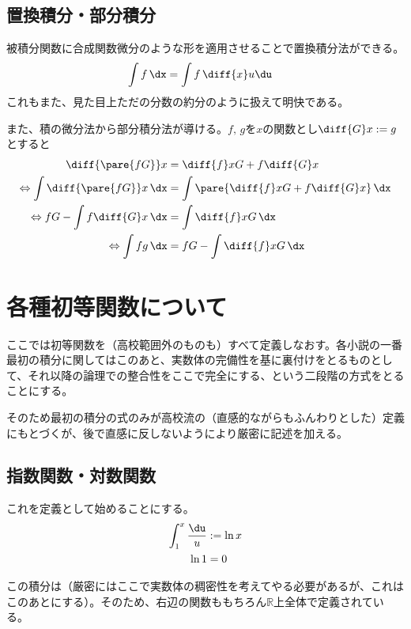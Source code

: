 \subsection{置換積分・部分積分}
被積分関数に合成関数微分のような形を適用させることで置換積分法ができる。
\begin{align}
    \int f\,\dx & =\int f\,\diff{x}u\du \label{eq:1.7}
\end{align}
これもまた、見た目上ただの分数の約分のように扱えて明快である。

また、積の微分法から部分積分法が導ける。$f,\,g$を$x$の関数とし$\diff{G}x:=g$とすると
\begin{align}
    \begin{aligned}
        \diff{\pare{fG}}x                          & =\diff{f}xG+f\diff{G}x                 \\
        \Leftrightarrow \int\diff{\pare{fG}}x\,\dx & =\int\pare{\diff{f}xG+f\diff{G}x}\,\dx \\
        \Leftrightarrow fG-\int f\diff{G}x\,\dx    & =\int\diff{f}xG\,\dx                   \\
        \Leftrightarrow \int fg\,\dx               & =fG-\int\diff{f}xG\,\dx
    \end{aligned}\label{eq:1.8}
\end{align}
\clearpage
\section{各種初等関数について}
ここでは初等関数を（高校範囲外のものも）すべて定義しなおす。各小説の一番最初の積分に関してはこのあと、実数体の完備性を基に裏付けをとるものとして、それ以降の論理での整合性をここで完全にする、という二段階の方式をとることにする。

そのため最初の積分の式のみが高校流の（直感的ながらもふんわりとした）定義にもとづくが、後で直感に反しないようにより厳密に記述を加える。
\subsection{指数関数・対数関数}
これを定義として始めることにする。
\begin{align}
    \begin{aligned}
        \int_1^x \frac{\du}u & :=\ln x \\
        \ln 1                & =0
    \end{aligned}\label{eq:1.9}
\end{align}

この積分は（厳密にはここで実数体の稠密性を考えてやる必要があるが、これはこのあとにする）。そのため、右辺の関数ももちろん$\mathbb{R}$上全体で定義されている。

